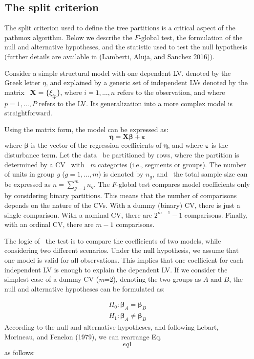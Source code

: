 \hypertarget{the-split-criterion}{%
\subsection{The split criterion}\label{the-split-criterion}}

The split criterion used to define the tree partitions is a critical
aspect of the pathmox algorithm. Below we describe the \(F\)-global test,
the formulation of the null and alternative hypotheses, and the
statistic used to test the null hypothesis (further details are
available in (Lamberti, Aluja, and Sanchez 2016)).

Consider a simple structural model with one dependent LV, denoted by the
Greek letter \textbf{\(\eta\)}, and explained by a generic set of independent
LVs denoted by the matrix ~\textbf{X} = \(\{\xi_{ip}\}\), where
\(i = 1, \ldots, n\) refers to the observation, and where
\(p = 1, \ldots, P\) refers to the LV. Its generalization into a more
complex model is straightforward.~

Using the matrix form, the model can be expressed as:~ \[\label{eq1}
\boldsymbol{\eta} = \textbf{X}\boldsymbol{\beta} + \boldsymbol{\varepsilon}\]
where \(\boldsymbol{\beta}\) is the vector of the regression coefficients
of \(\boldsymbol{\eta}\), and where \(\boldsymbol{\varepsilon}\) is the
disturbance term. Let the data ~be partitioned by rows, where the
partition is determined by a CV ~with ~\emph{m} categories (i.e., segments or
groups). The number of units in group \emph{g} (\(g=1,\ldots, m\)) is denoted
by \(n_g\), and ~the total sample size can be expressed as
\(n=\sum_{g=1}^m n_g\). The \(F\)-global test compares model coefficients
only by considering binary partitions. This means that the number of
comparisons depends on the nature of the CVs. With a dummy (binary) CV,
there is just a single comparison. With a nominal CV, there are
\(2^{m-1}-1\) comparisons. Finally, with an ordinal CV, there are \(m-1\)
comparisons.

The logic of ~the test is to compare the coefficients of two models,
while considering two different scenarios. Under the null hypothesis, we
assume that one model is valid for all observations. This implies that
one coefficient for each independent LV is enough to explain the
dependent LV. If we consider the simplest case of a dummy CV (\emph{m}=2),
denoting the two groups as \(A\) and \(B\), the null and alternative
hypotheses can be formulated as:

\[\begin{aligned}
\label{eq2}
H_0: \boldsymbol{\beta}_A = \boldsymbol{\beta}_B \\
H_1: \boldsymbol{\beta}_A \ne \boldsymbol{\beta}_B
\end{aligned}\] According to the null and alternative hypotheses, and
following Lebart, Morineau, and Fenelon (1979), we can rearrange Eq.
\protect\hyperlink{eq1}{\[eq1\]} as follows:

